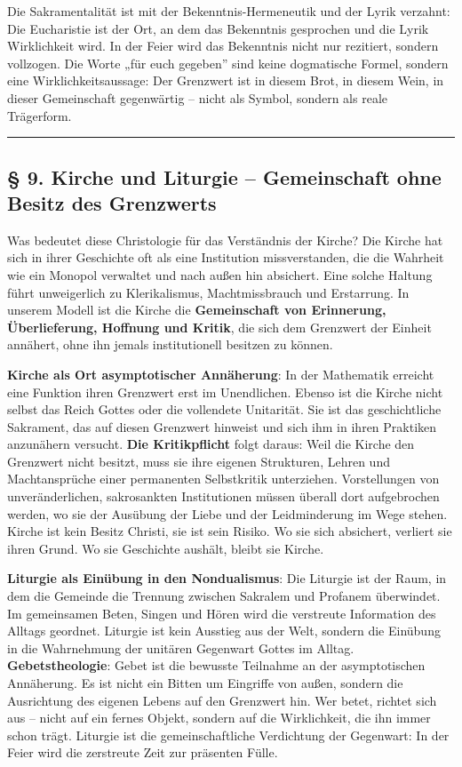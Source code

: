 \documentclass[
  ngerman,
]{article}
\begin{document}
Die Sakramentalität ist mit der Bekenntnis-Hermeneutik und der Lyrik
verzahnt: Die Eucharistie ist der Ort, an dem das Bekenntnis gesprochen
und die Lyrik Wirklichkeit wird. In der Feier wird das Bekenntnis nicht
nur rezitiert, sondern vollzogen. Die Worte „für euch gegeben'' sind
keine dogmatische Formel, sondern eine Wirklichkeitsaussage: Der
Grenzwert ist in diesem Brot, in diesem Wein, in dieser Gemeinschaft
gegenwärtig -- nicht als Symbol, sondern als reale Trägerform.

\begin{center}\rule{0.5\linewidth}{0.5pt}\end{center}

\subsection{§ 9. Kirche und Liturgie -- Gemeinschaft ohne Besitz des
Grenzwerts}\label{kirche-und-liturgie-gemeinschaft-ohne-besitz-des-grenzwerts}

Was bedeutet diese Christologie für das Verständnis der Kirche? Die
Kirche hat sich in ihrer Geschichte oft als eine Institution
missverstanden, die die Wahrheit wie ein Monopol verwaltet und nach
außen hin absichert. Eine solche Haltung führt unweigerlich zu
Klerikalismus, Machtmissbrauch und Erstarrung. In unserem Modell ist die
Kirche die \textbf{Gemeinschaft von Erinnerung, Überlieferung, Hoffnung
und Kritik}, die sich dem Grenzwert der Einheit annähert, ohne ihn
jemals institutionell besitzen zu können.

\textbf{Kirche als Ort asymptotischer Annäherung}: In der Mathematik
erreicht eine Funktion ihren Grenzwert erst im Unendlichen. Ebenso ist
die Kirche nicht selbst das Reich Gottes oder die vollendete Unitarität.
Sie ist das geschichtliche Sakrament, das auf diesen Grenzwert hinweist
und sich ihm in ihren Praktiken anzunähern versucht. \textbf{Die
Kritikpflicht} folgt daraus: Weil die Kirche den Grenzwert nicht
besitzt, muss sie ihre eigenen Strukturen, Lehren und Machtansprüche
einer permanenten Selbstkritik unterziehen. Vorstellungen von
unveränderlichen, sakrosankten Institutionen müssen überall dort
aufgebrochen werden, wo sie der Ausübung der Liebe und der Leidminderung
im Wege stehen. Kirche ist kein Besitz Christi, sie ist sein Risiko. Wo
sie sich absichert, verliert sie ihren Grund. Wo sie Geschichte aushält,
bleibt sie Kirche.

\textbf{Liturgie als Einübung in den Nondualismus}: Die Liturgie ist der
Raum, in dem die Gemeinde die Trennung zwischen Sakralem und Profanem
überwindet. Im gemeinsamen Beten, Singen und Hören wird die verstreute
Information des Alltags geordnet. Liturgie ist kein Ausstieg aus der
Welt, sondern die Einübung in die Wahrnehmung der unitären Gegenwart
Gottes im Alltag. \textbf{Gebetstheologie}: Gebet ist die bewusste
Teilnahme an der asymptotischen Annäherung. Es ist nicht ein Bitten um
Eingriffe von außen, sondern die Ausrichtung des eigenen Lebens auf den
Grenzwert hin. Wer betet, richtet sich aus -- nicht auf ein fernes
Objekt, sondern auf die Wirklichkeit, die ihn immer schon trägt.
Liturgie ist die gemeinschaftliche Verdichtung der Gegenwart: In der
Feier wird die zerstreute Zeit zur präsenten Fülle.
\end{document}
